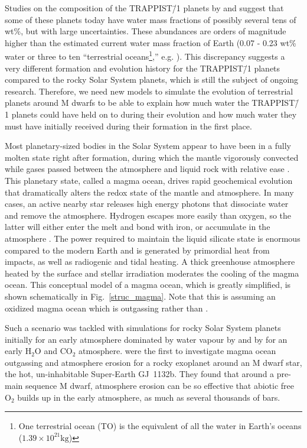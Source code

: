 \documentclass[oneside,twocolumn]{article}
\newcommand{\eg}{e.g. }
\begin{document}
Studies on the composition of the TRAPPIST\=/1 planets by \citet{Dorn2018} and \citet{Unterborn2018} suggest that some of these planets today have water mass fractions of possibly several tens of wt\%, but with large uncertainties. These abundances are orders of magnitude higher than the estimated current water mass fraction of Earth (0.07 - 0.23 wt\% water or three to ten ``terrestrial oceans\footnote{One terrestrial ocean (TO) is the equivalent of all the water in Earth's oceans ($1.39 \times 10^{21} \si{\kilogram}$)},'' \eg \citet{Elkins-Tanton2008,Pearson2014,Schmandt1265}). This discrepancy suggests a very different formation and evolution history for the TRAPPIST\=/1 planets compared to the rocky Solar System planets, which is still the subject of ongoing research.
Therefore, we need new models to simulate the evolution of terrestrial planets around M dwarfs to be able to explain how much water the TRAPPIST\=/1 planets could have held on to during their evolution and how much water they must have initially received during their formation in the first place.

Most planetary-sized bodies in the Solar System appear to have been in a fully molten state right after formation, during which the mantle vigorously convected while gases passed between the atmosphere and liquid rock with relative ease \citep{Wood1970, Solomon1979, Wetherill1990, Lammer2018A}. 
This planetary state, called a magma ocean, drives rapid geochemical evolution that dramatically alters the redox state of the mantle and atmosphere. 
In many cases, an active nearby star releases high energy photons that dissociate water and remove the atmosphere. Hydrogen escapes more easily than oxygen, so the latter will either enter the melt and bond with iron, or accumulate in the atmosphere \citep[\eg][]{Luger2015a}. The power required to maintain the liquid silicate state is enormous compared to the modern Earth and is generated by primordial heat from impacts, as well as radiogenic and tidal heating. A thick greenhouse atmosphere heated by the surface and stellar irradiation moderates the cooling of the magma ocean. This conceptual model of a magma ocean, which is greatly simplified, is shown schematically in Fig.~\ref{struc_magma}. Note that this is assuming an oxidized magma ocean which is outgassing  rather than .

Such a scenario was tackled with simulations for rocky Solar System planets initially for an early atmosphere dominated by water vapour by \citet{Matsui1986,Zahnle1988,Abe1993,Abe1997,Solomatov2000,Zahnle2015} and by \citet{Elkins-Tanton2008} for an early $\mathrm{H_2O}$ and $\mathrm{CO_2}$ atmosphere.
\citet{Schaefer2016} were the first to investigate magma ocean outgassing and atmosphere erosion for a rocky exoplanet around an M dwarf star, the hot, un-inhabitable Super-Earth GJ~1132b.
They found that around a pre-main sequence M dwarf, atmosphere erosion can be so effective that abiotic free $\mathrm{O_2}$ builds up in the early atmosphere, as much as several thousands of bars. 
\end{document}
